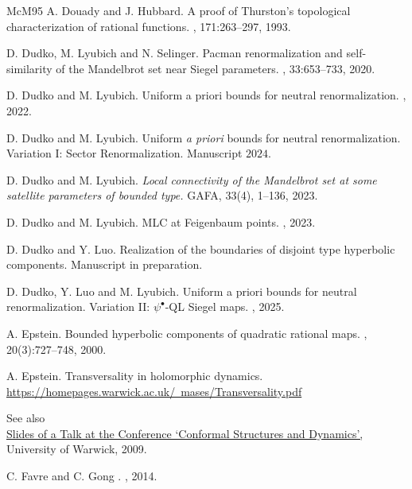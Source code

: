 \documentclass[11pt, reqno]{amsart}
\numberwithin{equation}{section}
\theoremstyle{plain}
\theoremstyle{theorem}
\theoremstyle{plain}
\theoremstyle{definition}
\numberwithin{figure}{section}
\begin{document}
\begin{thebibliography}{McM95}
A. Douady and J. Hubbard.
\newblock A proof of Thurston's topological characterization of rational functions.
, 171:263--297, 1993.

D. Dudko, M. Lyubich and N. Selinger.
\newblock Pacman renormalization and self-similarity of the Mandelbrot set near Siegel parameters.
, 33:653--733, 2020.

D. Dudko and M. Lyubich.
\newblock Uniform a priori bounds for neutral renormalization.
, 2022.


 D. Dudko and M. Lyubich. Uniform \emph{a priori} bounds for neutral renormalization. Variation I:  Sector Renormalization. Manuscript $2024$.

 D. Dudko and M. Lyubich. \emph{Local connectivity of the Mandelbrot set at some satellite parameters of bounded type.} GAFA, 33(4), 1–136, 2023.

D. Dudko and M. Lyubich. \newblock MLC at Feigenbaum points. , 2023.


 D. Dudko and Y. Luo. Realization of the boundaries of disjoint type hyperbolic components. Manuscript in preparation. 

D. Dudko, Y. Luo and M. Lyubich.
\newblock Uniform a priori bounds for neutral renormalization. Variation II: $\psi^\bullet$-QL Siegel maps.
, 2025.

A. Epstein.
\newblock Bounded hyperbolic components of quadratic rational maps.
, 20(3):727--748, 2000.

A. Epstein.
\newblock Transversality in holomorphic dynamics.
\\ \href{https://homepages.warwick.ac.uk/~mases/Transversality.pdf}{https://homepages.warwick.ac.uk/~mases/Transversality.pdf}

\newblock See also \\ \href{https://icerm.brown.edu/materials/Slides/sp-s12-w1/Transversality_Principles_in_Holomorphic_Dynamics_%5D_Adam_Epstein,_University_of_Warwick.pdf}{Slides of a Talk at the Conference ‘Conformal Structures and Dynamics’,} \\ University of Warwick, 2009.

C. Favre and C. Gong
.
, 2014.



\end{thebibliography}
\end{document}
